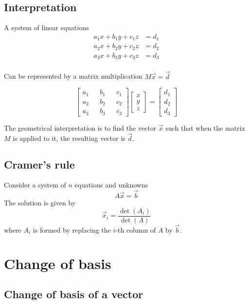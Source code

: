 \documentclass[a4paper]{article}
\begin{document}
\subsection{Interpretation}

A system of linear equations
\begin{align*}
    a_1x + b_1y + c_1z &= d_1 \\
    a_2x + b_2y + c_2z &= d_2 \\
    a_3x + b_3y + c_3z &= d_3 \\
\end{align*}

Can be represented by a matrix multiplication \(M\vec{x}=\vec{d}\)

\[
    \begin{bmatrix} 
        a_1 && b_1 && c_1 \\
        a_2 && b_2 && c_2 \\
        a_3 && b_3 && c_3
    \end{bmatrix}
    \begin{bmatrix} 
        x \\ y \\ z
    \end{bmatrix}
    =
    \begin{bmatrix} 
        d_1 \\ d_2 \\ d_3
    \end{bmatrix}
\]

The geometrical interpretation is to find the vector \(\vec{x}\)
such that when the matrix \(M\) is applied to it, the resulting vector is \(\vec{d}\).

\subsection{Cramer's rule}

Consider a system of \(n\) equations and unknowns
\[
    A\vec{x}=\vec{b}
\]
The solution is given by
\[
    \vec{x}_i = \frac{\det(A_i)}{\det(A)}
\]
where \(A_i\) is formed by replacing the \(i\)-th column
of \(A\) by \(\vec{b}\).

\pagebreak

\section{Change of basis}

\subsection{Change of basis of a vector}
\end{document}
